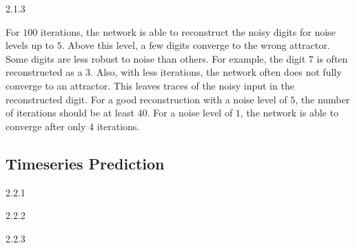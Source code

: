 \begin{task}{2.1.3}
\end{task}

For $100$ iterations, the network is able to reconstruct the noisy digits for noise levels up to
$5$. Above this level, a few digits converge to the wrong attractor. Some digits are less robust to
noise than others. For example, the digit $7$ is often reconstructed as a $3$. Also, with less
iterations, the network often does not fully converge to an attractor. This leaves traces of the
noisy input in the reconstructed digit. For a good reconstruction with a noise level of $5$, the
number of iterations should be at least $40$. For a noise level of $1$, the network is able to
converge after only $4$ iterations.


\subsection{Timeseries Prediction}
\label{ex:2.2}


\begin{task}{2.2.1}
\end{task}



\begin{task}{2.2.2}
\end{task}



\begin{task}{2.2.3}
\end{task}

